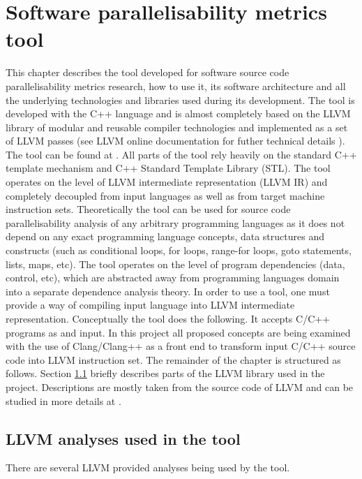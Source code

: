 \chapter{Software parallelisability metrics tool}
\qquad This chapter describes the tool developed for software source code parallelisability metrics research, how to use it, its software architecture and all the underlying technologies and libraries used during its development. \newline\null\qquad The tool is developed with the C++ language and is almost completely based on the \textsc{LLVM} library of modular and reusable compiler technologies \cite{llvm} \cite{llvm-official-website} and implemented as a set of LLVM passes (see LLVM online documentation for futher technical details \cite{llvm-online-docs}). The tool can be found at \cite{ppar-tool}. All parts of the tool rely heavily on the standard C++ template mechanism and C++ Standard Template Library (STL). \newline \null\qquad The tool operates on the level of LLVM intermediate representation \cite{llvm-online-docs-ir} (LLVM IR) and completely decoupled from input languages as well as from target machine instruction sets. Theoretically the tool can be used for source code parallelisability analysis of any arbitrary programming languages as it does not depend on any exact programming language concepts, data structures and constructs (such as conditional loops, for loops, range-for loops, goto statements, lists, maps, etc). The tool operates on the level of program dependencies (data, control, etc), which are abstracted away from programming languages domain into a separate dependence analysis theory. In order to use a tool, one must provide a way of compiling input language into LLVM intermediate representation. \newline \null\qquad Conceptually the tool does the following. It accepts C/C++ programs as and input. \newline \null\qquad In this project all proposed concepts are being examined with the use of Clang/Clang++ as a front end to transform input C/C++ source code into LLVM instruction set. \newline\null\qquad The remainder of the chapter is structured as follows. Section \ref{implementation-llvm-analyses} briefly describes parts of the LLVM library used in the project. Descriptions are mostly taken from the source code of LLVM and can be studied in more details at \cite{llvm-doxygen-docs}.     

\section{LLVM analyses used in the tool} \label{implementation-llvm-analyses}
\qquad There are several LLVM provided analyses being used by the tool.

